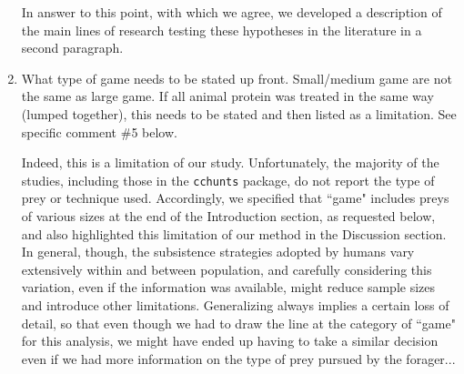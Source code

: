\documentclass{article}
\newcommand{\rev}[1]{{\color{ForestGreen}#1}}
\begin{document}
\begin{enumerate}
\rev{In answer to this point, with which we agree, we developed a description of the main lines of research testing these hypotheses in the literature in a second paragraph.}

    \item What type of game needs to be stated up front. Small/medium game are not the same as large game. If all animal protein was treated in the same way (lumped together), this needs to be stated and then listed as a limitation. See specific comment \#5 below.

\rev{Indeed, this is a limitation of our study. Unfortunately, the majority of the studies, including those in the \texttt{cchunts} package, do not report the type of prey or technique used. Accordingly, we specified that ``game" includes preys of various sizes at the end of the Introduction section, as requested below, and also highlighted this limitation of our method in the Discussion section. In general, though, the subsistence strategies adopted by humans vary extensively within and between population, and carefully considering this variation, even if the information was available, might reduce sample sizes and introduce other limitations. Generalizing always implies a certain loss of detail, so that even though we had to draw the line at the category of ``game" for this analysis, we might have ended up having to take a similar decision even if we had more information on the type of prey pursued by the forager...}

\end{enumerate}
\end{document}

